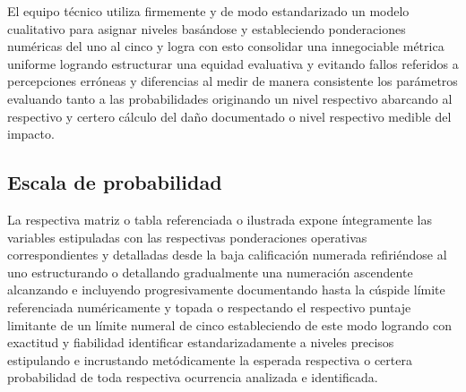 \documentclass[11pt,spanish]{article}
\begin{document}
El equipo técnico utiliza firmemente y de modo estandarizado un modelo cualitativo para asignar niveles basándose y estableciendo ponderaciones numéricas del uno al cinco y logra con esto consolidar una innegociable métrica uniforme logrando estructurar una equidad evaluativa y evitando fallos referidos a percepciones erróneas y diferencias al medir de manera consistente los parámetros evaluando tanto a las probabilidades originando un nivel respectivo abarcando al respectivo y certero cálculo del daño documentado o nivel respectivo medible del impacto.

\subsection{Escala de probabilidad}

La respectiva matriz o tabla referenciada o ilustrada expone íntegramente las variables estipuladas con las respectivas ponderaciones operativas correspondientes y detalladas desde la baja calificación numerada refiriéndose al uno estructurando o detallando gradualmente una numeración ascendente alcanzando e incluyendo progresivamente documentando hasta la cúspide límite referenciada numéricamente y topada o respectando el respectivo puntaje limitante de un límite numeral de cinco estableciendo de este modo logrando con exactitud y fiabilidad identificar estandarizadamente a niveles precisos estipulando e incrustando metódicamente la esperada respectiva o certera probabilidad de toda respectiva ocurrencia analizada e identificada.
\end{document}
